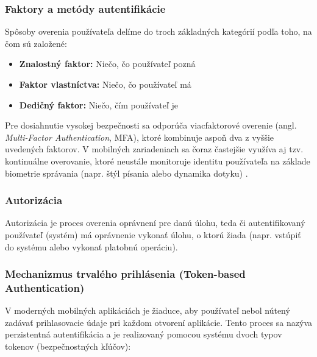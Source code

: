 \subsubsection{Faktory a metódy autentifikácie}
Spôsoby overenia používateľa delíme do troch základných kategórií podľa toho, na čom sú založené:
\begin{itemize}[noitemsep]
    \item \textbf{Znalostný faktor:} Niečo, čo používateľ pozná 
    \item \textbf{Faktor vlastníctva:} Niečo, čo používateľ má 
    \item \textbf{Dedičný faktor:} Niečo, čím používateľ je 
\end{itemize}

Pre dosiahnutie vysokej bezpečnosti sa odporúča viacfaktorové overenie (angl. \textit{Multi-Factor Authentication}, MFA),
ktoré kombinuje aspoň dva z vyššie uvedených faktorov. V mobilných zariadeniach sa čoraz častejšie využíva aj tzv. 
kontinuálne overovanie, ktoré neustále monitoruje identitu používateľa na základe biometrie správania 
 (napr. štýl písania alebo dynamika dotyku) \cite{wiki2025autentifikacia}. 

\subsubsection{Autorizácia}
Autorizácia je proces overenia oprávnení pre danú úlohu, teda či autentifikovaný používateľ (systém) má oprávnenie vykonať úlohu,
 o ktorú žiada (napr. vstúpiť do systému alebo vykonať platobnú operáciu).
\subsubsection{Mechanizmus trvalého prihlásenia (Token-based Authentication)}
V moderných mobilných aplikáciách je žiaduce, aby používateľ nebol nútený zadávať prihlasovacie
údaje pri každom otvorení aplikácie. Tento proces sa nazýva perzistentná autentifikácia a 
je realizovaný pomocou systému dvoch typov tokenov (bezpečnostných kľúčov):

